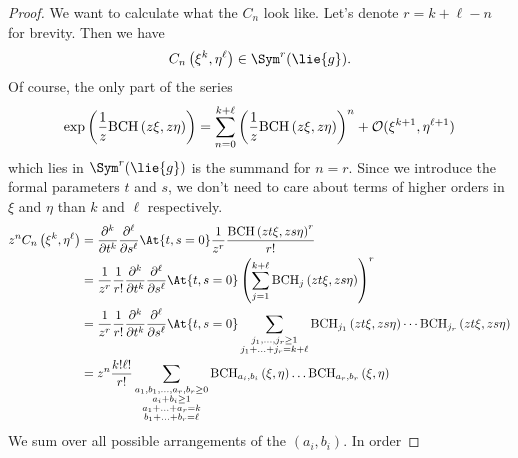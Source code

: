 \begin{proof}
	We want to calculate what the $C_n$ look like. Let's denote $r = k 
	+ \ell - n$ for brevity. Then we have
	\begin{equation*}
		C_n \left( \xi^k, \eta^{\ell} \right)
		\in \Sym^r(\lie{g}).
	\end{equation*}
	Of course, the only part of the series
	\begin{equation*}
		\exp\left(
			\frac{1}{z} \mathrm{BCH}\left(z \xi, z \eta\right)
		\right)
		=
		\sum\limits_{n = 0}^{k + \ell}
		\left(
			\frac{1}{z} \mathrm{BCH}\left(z \xi, z \eta\right)
		\right)^n
		+ \mathcal{O}(\xi^{k + 1}, \eta^{\ell + 1})
	\end{equation*} 
	which lies in $\Sym^r(\lie{g})$ is the summand for 
	$n = r $. Since we introduce the formal parameters $t$ and $s$, we don't 
	need to care about terms of higher orders in $\xi$ and $\eta$ than $k$ 
	and $\ell$ respectively.
    \begin{align*}
        z^n C_n \left( \xi^k, \eta^{\ell} \right)
        & =
        \frac{\partial^k}{\partial t^k}
        \frac{\partial^{\ell}}{\partial s^{\ell}}
        \At{t,s = 0}
        \frac{1}{z^r}
        \frac{\bch{z t \xi}{z s \eta}^r    }{r!}
        \\
        & =
        \frac{1}{z^r}
        \frac{1}{r!}
        \frac{\partial^k}{\partial t^k}
        \frac{\partial^{\ell}}{\partial s^{\ell}}
        \At{t,s = 0}
        \left(
            \sum\limits_{j = 1}^{k + \ell}
            \bchpart{j}{z t \xi}{z s \eta}
        \right)^r
        \\
        & =
        \frac{1}{z^r}
        \frac{1}{r!}
        \frac{\partial^k}{\partial t^k}
        \frac{\partial^{\ell}}{\partial s^{\ell}}
        \At{t,s = 0}
        \sum\limits_{\substack{
        	j_1, \ldots, j_r \geq 1 \\
            j_1 + \ldots + j_r = k + \ell
        }}
        \bchpart{j_1}{z t \xi}{z s \eta} 
        \cdots
        \bchpart{j_r}{z t \xi}{z s \eta}
        \\
        & =
        z^n
        \frac{k! \ell!}{r!}
        \sum\limits_{\substack{a_1, b_1, \ldots, a_r, b_r \geq 0 \\
            a_i + b_i \geq 1 \\
            a_1 + \ldots + a_r = k \\
            b_1 + \ldots + b_r = \ell
        }}
        \bchparts{a_i}{b_i}{\xi}{\eta}
        \ldots
        \bchparts{a_r}{b_r}{\xi}{\eta}
    \end{align*}
    We sum over all possible arrangements of the $(a_i, b_i)$. In order 

\end{proof}
